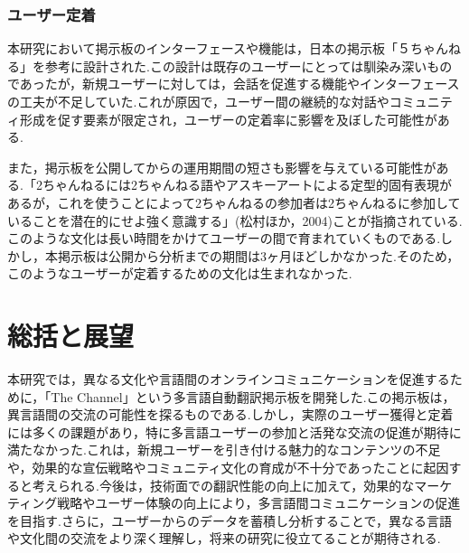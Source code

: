 \documentclass[b5paper,12pt,dvipdfmx]{jsreport}
\begin{document}
\subsubsection{ユーザー定着}
本研究において掲示板のインターフェースや機能は，日本の掲示板「５ちゃんねる」を参考に設計された.この設計は既存のユーザーにとっては馴染み深いものであったが，新規ユーザーに対しては，会話を促進する機能やインターフェースの工夫が不足していた.これが原因で，ユーザー間の継続的な対話やコミュニティ形成を促す要素が限定され，ユーザーの定着率に影響を及ぼした可能性がある.

また，掲示板を公開してからの運用期間の短さも影響を与えている可能性がある.「2ちゃんねるには2ちゃんねる語やアスキーアートによる定型的固有表現があるが，これを使うことによって2ちゃんねるの参加者は2ちゃんねるに参加していることを潜在的にせよ強く意識する」(松村ほか，2004)ことが指摘されている.このような文化は長い時間をかけてユーザーの間で育まれていくものである.しかし，本掲示板は公開から分析までの期間は3ヶ月ほどしかなかった.そのため，このようなユーザーが定着するための文化は生まれなかった.

\section{総括と展望}

本研究では，異なる文化や言語間のオンラインコミュニケーションを促進するために，「The Channel」という多言語自動翻訳掲示板を開発した.この掲示板は，異言語間の交流の可能性を探るものである.しかし，実際のユーザー獲得と定着には多くの課題があり，特に多言語ユーザーの参加と活発な交流の促進が期待に満たなかった.これは，新規ユーザーを引き付ける魅力的なコンテンツの不足や，効果的な宣伝戦略やコミュニティ文化の育成が不十分であったことに起因すると考えられる.今後は，技術面での翻訳性能の向上に加えて，効果的なマーケティング戦略やユーザー体験の向上により，多言語間コミュニケーションの促進を目指す.さらに，ユーザーからのデータを蓄積し分析することで，異なる言語や文化間の交流をより深く理解し，将来の研究に役立てることが期待される.

\end{document}
